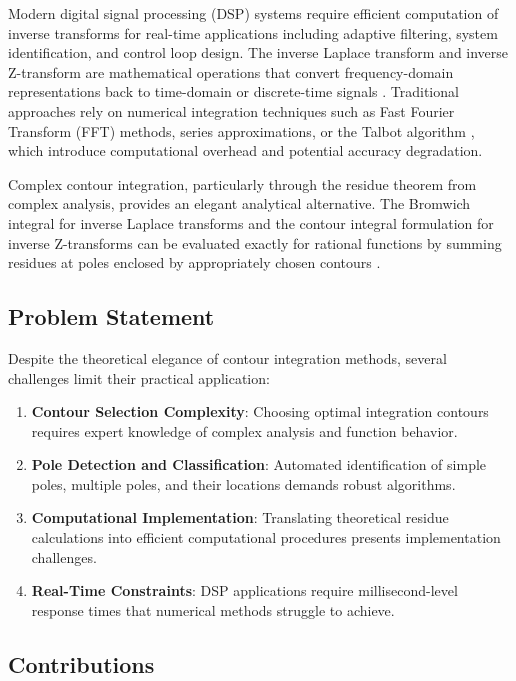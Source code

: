 \documentclass[conference]{IEEEtran}
\begin{document}
Modern digital signal processing (DSP) systems require efficient computation of inverse transforms for real-time applications including adaptive filtering, system identification, and control loop design. The inverse Laplace transform and inverse Z-transform are mathematical operations that convert frequency-domain representations back to time-domain or discrete-time signals \cite{oppenheim2010}. Traditional approaches rely on numerical integration techniques such as Fast Fourier Transform (FFT) methods, series approximations, or the Talbot algorithm \cite{talbot1979}, which introduce computational overhead and potential accuracy degradation.

Complex contour integration, particularly through the residue theorem from complex analysis, provides an elegant analytical alternative. The Bromwich integral for inverse Laplace transforms and the contour integral formulation for inverse Z-transforms can be evaluated exactly for rational functions by summing residues at poles enclosed by appropriately chosen contours \cite{churchill2013}.

\subsection{Problem Statement}

Despite the theoretical elegance of contour integration methods, several challenges limit their practical application:

\begin{enumerate}
    \item \textbf{Contour Selection Complexity}: Choosing optimal integration contours requires expert knowledge of complex analysis and function behavior.
    \item \textbf{Pole Detection and Classification}: Automated identification of simple poles, multiple poles, and their locations demands robust algorithms.
    \item \textbf{Computational Implementation}: Translating theoretical residue calculations into efficient computational procedures presents implementation challenges.
    \item \textbf{Real-Time Constraints}: DSP applications require millisecond-level response times that numerical methods struggle to achieve.
\end{enumerate}

\subsection{Contributions}
\end{document}
